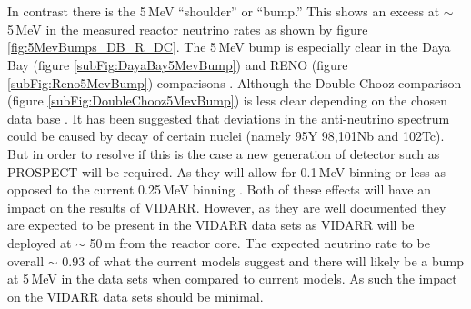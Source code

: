 \\\\In contrast there is the 5\,MeV ``shoulder'' or ``bump.'' This shows an excess at $\sim$ 5\,MeV in the measured reactor neutrino rates as shown by figure \ref{fig:5MevBumps_DB_R_DC}. The 5\,MeV bump is especially clear in the Daya Bay (figure \ref{subFig:DayaBay5MevBump}) and RENO (figure \ref{subFig:Reno5MevBump}) comparisons \cite{Hayes_implicationsShoulder_2015} \cite{dayaBay2016_anFlux} \cite{reno_recentResults_2014}. Although the Double Chooz comparison (figure \ref{subFig:DoubleChooz5MevBump}) is less clear depending on the chosen data base \cite{Hayes_implicationsShoulder_2015} \cite{Hayes_implicationsShoulder_2015}. It has been suggested that deviations in the anti-neutrino spectrum could be caused by decay of certain nuclei (namely 95Y 98,101Nb and 102Tc). But in order to resolve if this is the case a new generation of detector such as PROSPECT \cite{Ashenfelter_PROSPECT_2016} will be required. As they will allow for 0.1\,MeV binning or less as opposed to the current 0.25\,MeV binning \cite{AaSonzogni_fineAnSpectra_2017}. Both of these effects will have an impact on the results of VIDARR. However, as they are well documented they are expected to be present in the VIDARR data sets as VIDARR will be deployed at $\sim$ 50\,m from the reactor core. The expected neutrino rate to be overall $\sim$ 0.93 of what the current models suggest and there will likely be a bump at 5\,MeV in the data sets when compared to current models. As such the impact on the VIDARR data sets should be minimal.

